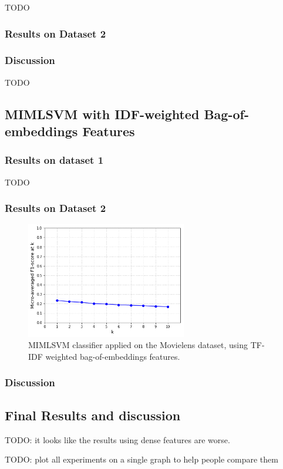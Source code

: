 {\color{red} TODO}

\subsubsection{Results on Dataset 2}



\subsubsection{Discussion}

{\color{red} TODO}

\subsection{MIMLSVM with IDF-weighted Bag-of-embeddings Features}

\subsubsection{Results on dataset 1}

{\color{red} TODO}

\subsubsection{Results on Dataset 2}

\begin{figure}[H]
    \centering
    \includegraphics[width=7cm]{chapters/05_experiments/images/movielens-mimlsvm-embeddings.png}
    \caption{MIMLSVM classifier applied on the Movielens dataset, using TF-IDF weighted bag-of-embeddings features.}
    \label{fig:knn_lda_movielens}
\end{figure}

\subsubsection{Discussion}

\subsection{Final Results and discussion}

{\color{red} TODO: it looks like the results using dense features are worse.}

{\color{red} TODO: plot all experiments on a single graph to help people compare them}